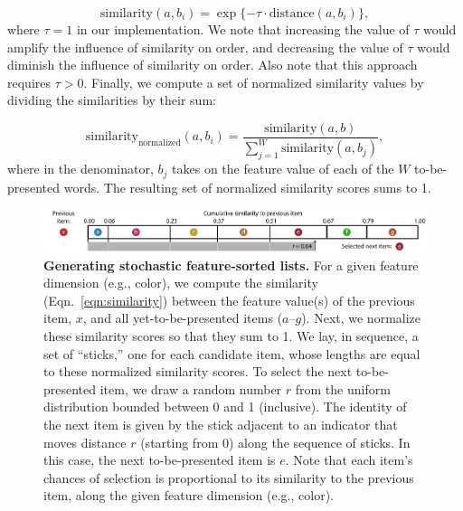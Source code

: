 \documentclass[11pt]{article}
\begin{document}
\begin{equation}
 \mathrm{similarity}(a, b_i) = \exp\{-\tau \cdot
\mathrm{distance}(a, b_i)\}, \label{eqn:similarity}
\end{equation}
where $\tau = 1$ in our implementation. We note that increasing the value of
$\tau$ would amplify the influence of similarity on order, and decreasing the
value of $\tau$ would diminish the influence of similarity on order. Also note
that this approach requires $\tau > 0$. Finally, we compute a set of
normalized similarity values by dividing the similarities by their sum:

\begin{equation}
\mathrm{similarity}_{\mathrm{normalized}}(a, b_i) = \frac{\mathrm{similarity}(a,
b)}{\sum_{j=1}^W \mathrm{similarity}(a, b_j)},
\end{equation}
where in the denominator, $b_j$ takes on the feature value of each of the $W$
to-be-presented words. The resulting set of normalized similarity scores sums
to 1.

\begin{figure}[tp]
    \centering
        \includegraphics[width=\textwidth]{figures/stick}

\caption{\textbf{Generating stochastic feature-sorted lists.} For a given
feature dimension (e.g., color), we compute the similarity
(Eqn.~\ref{eqn:similarity}) between the feature value(s) of the previous item,
$x$, and all yet-to-be-presented items ($a$--$g$). Next, we normalize these
similarity scores so that they sum to 1. We lay, in sequence, a set of
``sticks,'' one for each candidate item, whose lengths are equal to these
normalized similarity scores. To select the next to-be-presented item, we draw
a random number $r$ from the uniform distribution bounded between 0 and 1
(inclusive). The identity of the next item is given by the stick adjacent to an
indicator that moves distance $r$ (starting from 0) along the sequence of
sticks. In this case, the next to-be-presented item is $e$. Note that each
item's chances of selection is proportional to its similarity to the previous
item, along the given feature dimension (e.g., color).} \label{fig:stick}

\end{figure}
\end{document}
